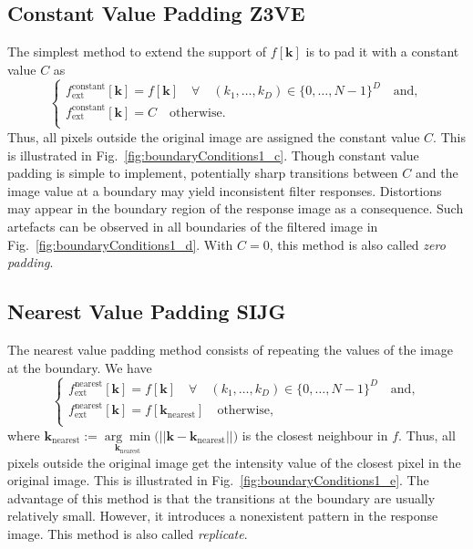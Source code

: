 \documentclass[fleqn,a4paper,oneside,openany]{book}
\newcommand\id[1]{{\hfill\normalsize{\idfont #1}}}
\begin{document}
\subsection[Constant Value Padding]{Constant Value Padding \id{Z3VE}}\label{sec:constantValuePadding}
%
The simplest method to extend the support of $f[\boldsymbol{k}]$ is to pad it with a constant value $C$ as
$$
\begin{cases}
f_{\text{ext}}^{\text{constant}}[\boldsymbol{k}]=f[\boldsymbol{k}] \quad\forall\quad (k_1,\dots,k_D)\in \{0,\dots,N-1\}^D \quad \text{and},\\
f_{\text{ext}}^{\text{constant}}[\boldsymbol{k}]=C \quad \text{otherwise}. \\
\end{cases}
$$
Thus, all pixels outside the original image are assigned the constant value $C$. This is illustrated in Fig.~\ref{fig:boundaryConditions1_c}.
Though constant value padding is simple to implement, potentially sharp transitions between $C$ and the image value at a boundary may yield inconsistent filter responses.
Distortions may appear in the boundary region of the response image as a consequence.
Such artefacts can be observed in all boundaries of the filtered image in Fig.~\ref{fig:boundaryConditions1_d}.
With $C=0$, this method is also called \textit{zero padding}.
%
\subsection[Nearest Value Padding]{Nearest Value Padding \id{SIJG}}
%
The nearest value padding method consists of repeating the values of the image at the boundary.
We have 
$$
\begin{cases}
f_{\text{ext}}^{\text{nearest}}[\boldsymbol{k}]=f[\boldsymbol{k}] \quad\forall\quad (k_1,\dots,k_D)\in \{0,\dots,N-1\}^D \quad \text{and},\\
f_{\text{ext}}^{\text{nearest}}[\boldsymbol{k}]=f[\boldsymbol{k}_{\text{nearest}}] \quad \text{otherwise},\\
\end{cases}
$$
where $\boldsymbol{k}_{\text{nearest}}:=\underset{\boldsymbol{k}_{\text{nearest}}}{\arg\min} \biggl(||\boldsymbol{k}-\boldsymbol{k}_{\text{nearest}}|| \biggr)$ is the closest neighbour in $f$. Thus, all pixels outside the original image get the intensity value of the closest pixel in the original image.
This is illustrated in Fig.~\ref{fig:boundaryConditions1_e}.
The advantage of this method is that the transitions at the boundary are usually relatively small.
However, it introduces a nonexistent pattern in the response image.
This method is also called \textit{replicate}.
%
\end{document}
